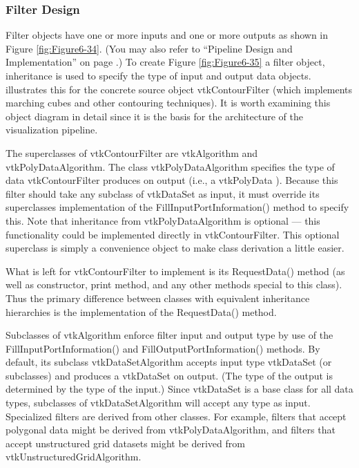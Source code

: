 \subsubsection{Filter Design}

Filter objects have one or more inputs and one or more outputs as shown in Figure \ref{fig:Figure6-34}. (You may also refer to ``Pipeline Design and Implementation'' on page \pageref{subsec:pipeline_design_implementation}.) To create Figure \ref{fig:Figure6-35} a filter object, inheritance is used to specify the type of input and output data objects. illustrates this for the concrete source object vtkContourFilter (which implements marching cubes and other contouring techniques). It is worth examining this object diagram in detail since it is the basis for the architecture of the visualization pipeline.

The superclasses of vtkContourFilter are vtkAlgorithm and vtkPolyDataAlgorithm. The class vtkPolyDataAlgorithm specifies the type of data vtkContourFilter produces on output (i.e., a vtkPolyData ). Because this filter should take any subclass of vtkDataSet as input, it must override its superclasses implementation of the FillInputPortInformation() method to specify this. Note that inheritance from vtkPolyDataAlgorithm is optional --- this functionality could be implemented directly in vtkContourFilter. This optional superclass is simply a convenience object to make class derivation a little easier.

What is left for vtkContourFilter to implement is its RequestData() method (as well as constructor, print method, and any other methods special to this class). Thus the primary difference between classes with equivalent inheritance hierarchies is the implementation of the RequestData() method.

Subclasses of vtkAlgorithm enforce filter input and output type by use of the FillInputPortInformation() and FillOutputPortInformation() methods. By default, its subclass vtkDataSetAlgorithm accepts input type vtkDataSet (or subclasses) and produces a vtkDataSet on output. (The type of the output is determined by the type of the input.) Since vtkDataSet is a base class for all data types, subclasses of vtkDataSetAlgorithm will accept any type as input. Specialized filters are derived from other classes. For example, filters that accept polygonal data might be derived from vtkPolyDataAlgorithm, and filters that accept unstructured grid datasets might be derived from vtkUnstructuredGridAlgorithm.

